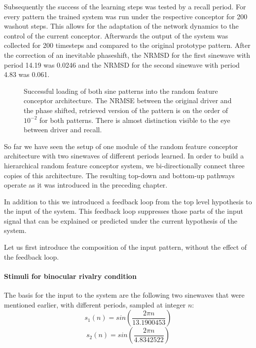 \documentclass{frontiersSCNS} %
\begin{document}
	Subsequently the success of the learning steps was tested by a recall period. For every pattern the trained system was run under the respective conceptor for 200 washout steps. This allows for the adaptation of the network dynamics to the control of the current conceptor. Afterwards the output of the system was collected for 200 timesteps and compared to the original prototype pattern. After the correction of an inevitable phaseshift, the NRMSD for the first sinewave with period 14.19 was 0.0246 and the NRMSD for the second sinewave with period 4.83 was 0.061. 
	
	    \begin{figure}
	        \centering
	       	
	      	\caption[Successful loading of both sine patterns in RFC]{Successful loading of both sine patterns into the random feature conceptor architecture. The NRMSE between the original driver and the phase shifted, retrieved version of the pattern is on the order of $10^{-2}$ for both patterns. There is almost distinction visible to the eye between driver and recall.}
	   	    \label{loading}
	    \end{figure}
	
	So far we have seen the setup of one module of the random feature conceptor architecture with two sinewaves of different periods learned. In order to build a hierarchical random feature conceptor system, we bi-directionally connect three copies of this architecture. The resulting top-down and bottom-up pathways operate as it was introduced in the preceding chapter. 
	
	
    In addition to this we introduced a feedback loop from the top level hypothesis to the input of the system. This feedback loop suppresses those parts of the input signal that can be explained or predicted under the current hypothesis of the system.
     
    Let us first introduce the composition of the input pattern, without the effect of the feedback loop.
    
    \paragraph{Stimuli for binocular rivalry condition}
    The basis for the input to the system are the following two sinewaves that were mentioned earlier, with different periods, sampled at integer $n$:
    \begin{equation}
		s_1(n) = sin(\frac{2 \pi n}{13.1900453})
	\end{equation}
	\begin{equation}
		s_2(n) = sin(\frac{2 \pi n}{4.8342522})
	\end{equation}
	
\end{document}
